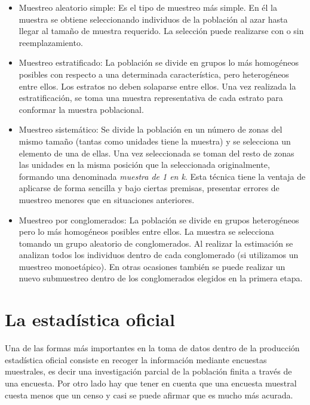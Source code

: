     \begin{itemize}[label=$\bullet$]
        \item Muestreo aleatorio simple: Es el tipo de muestreo más simple. En él la muestra se obtiene seleccionando individuos de la población al azar hasta llegar al tamaño de muestra requerido. La selección puede realizarse con o sin reemplazamiento.
        
        \item Muestreo estratificado: La población se divide en grupos lo más homogéneos posibles con respecto a una determinada característica, pero heterogéneos entre ellos. Los estratos no deben solaparse entre ellos. Una vez realizada la estratificación, se toma una muestra representativa de cada estrato para conformar la muestra poblacional.
        
        \item Muestreo sistemático: Se divide la población en un número de zonas del mismo tamaño (tantas como unidades tiene la muestra) y se selecciona un elemento de una  de ellas. Una vez seleccionada se toman del resto de zonas las unidades en la misma posición que la seleccionada originalmente, formando una denominada \textit{muestra de 1 en k}. Esta técnica tiene la ventaja de aplicarse de forma sencilla y bajo ciertas premisas, presentar errores de muestreo menores que en situaciones anteriores.
        
        \item Muestreo por conglomerados: La población se divide en grupos heterogéneos pero lo más homogéneos posibles entre ellos. La muestra se selecciona tomando un grupo aleatorio de conglomerados. Al realizar la estimación se analizan todos los individuos dentro de cada conglomerado (si utilizamos un muestreo monoetápico). En otras ocasiones también se puede realizar un nuevo submuestreo dentro de los conglomerados elegidos en la primera etapa. 
    \end{itemize}

\section{La estadística oficial}
Una de las formas más importantes en la toma de datos dentro de la producción estadística oficial consiste en recoger la información mediante encuestas muestrales, es decir una investigación parcial de la población finita a través de una encuesta. Por otro lado hay que tener en cuenta que una encuesta muestral cuesta menos que un censo y casi se puede afirmar que es mucho más acurada.\\

